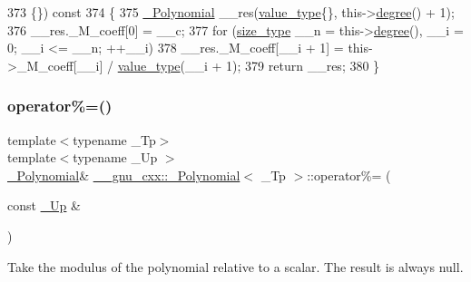 \begin{DoxyCode}
373                                           \{\}) \textcolor{keyword}{const}
374       \{
375         \hyperlink{class____gnu__cxx_1_1__Polynomial_ad2baf4c12b7e3ab131a592afa3f391ae}{\_Polynomial} \_\_res(\hyperlink{class____gnu__cxx_1_1__Polynomial_a725563351f50e76084a7a016c06f8a53}{value\_type}\{\}, this->\hyperlink{class____gnu__cxx_1_1__Polynomial_a07d9933aeeb9afbd823218ed921336cb}{degree}() + 1);
376         \_\_res.\_M\_coeff[0] = \_\_c;
377         \textcolor{keywordflow}{for} (\hyperlink{class____gnu__cxx_1_1__Polynomial_a6afe219c123c7a2fdc5abac8a6639053}{size\_type} \_\_n = this->\hyperlink{class____gnu__cxx_1_1__Polynomial_a07d9933aeeb9afbd823218ed921336cb}{degree}(), \_\_i = 0; \_\_i <= \_\_n; ++\_\_i)
378           \_\_res.\_M\_coeff[\_\_i + 1] = this->\_M\_coeff[\_\_i] / \hyperlink{class____gnu__cxx_1_1__Polynomial_a725563351f50e76084a7a016c06f8a53}{value\_type}(\_\_i + 1);
379         \textcolor{keywordflow}{return} \_\_res;
380       \}
\end{DoxyCode}
\mbox{\label{class____gnu__cxx_1_1__Polynomial_ade8196c94c8e169f00730730d0c6b99e}} 
\subsubsection{\texorpdfstring{operator\%=()}{operator\%=()}\hspace{0.1cm}{\footnotesize\ttfamily [1/2]}}
{\footnotesize\ttfamily template$<$typename \+\_\+\+Tp$>$ \\
template$<$typename \+\_\+\+Up $>$ \\
\hyperlink{class____gnu__cxx_1_1__Polynomial}{\+\_\+\+Polynomial}\& \hyperlink{class____gnu__cxx_1_1__Polynomial}{\+\_\+\+\_\+gnu\+\_\+cxx\+::\+\_\+\+Polynomial}$<$ \+\_\+\+Tp $>$\+::operator\%= (\begin{DoxyParamCaption}\item[{const \hyperlink{class____gnu__cxx_1_1__Polynomial_a242114d4b86648a5dff67a8221f80d40}{\+\_\+\+Up} \&}]{ }\end{DoxyParamCaption})\hspace{0.3cm}{\ttfamily [inline]}}

Take the modulus of the polynomial relative to a scalar. The result is always null. 

